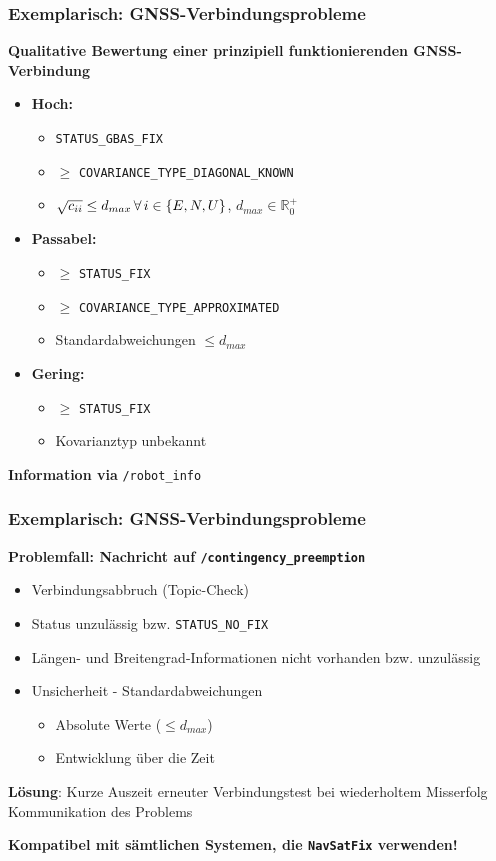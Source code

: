 \documentclass{beamer}
\newcommand{\code}[1]{\colorbox{light-gray}{\texttt{#1}}}
\begin{document}
\begin{frame}
  \frametitle{Exemplarisch: GNSS-Verbindungsprobleme}
  \textbf{Qualitative Bewertung einer prinzipiell funktionierenden GNSS-Verbindung}
  \begin{itemize}
    \item \textbf{Hoch:}
    \begin{itemize}
      \item \code{STATUS\_GBAS\_FIX}
      \item $\geq$ \code{COVARIANCE\_TYPE\_DIAGONAL\_KNOWN}
      \item $\sqrt{c_{ii}} \leq d_{max} \thinspace \forall \thinspace i \in \{E, N, U\}$, $d_{max} \in \mathbb{R}_{0}^{+}$
    \end{itemize}
    \item \textbf{Passabel:}
    \begin{itemize}
      \item $\geq$ \code{STATUS\_FIX}
      \item $\geq$ \code{COVARIANCE\_TYPE\_APPROXIMATED}
      \item Standardabweichungen $\leq d_{max}$
    \end{itemize}
    \item \textbf{Gering:}
    \begin{itemize}
      \item $\geq$ \code{STATUS\_FIX}
      \item Kovarianztyp unbekannt
    \end{itemize}
  \end{itemize}
  \textbf{Information via} \code{/robot\_info}
\end{frame}

\begin{frame}
  \frametitle{Exemplarisch: GNSS-Verbindungsprobleme}
  \textbf{Problemfall: Nachricht auf \code{/contingency\_preemption}}
  \begin{itemize}
    \item Verbindungsabbruch (Topic-Check)
    \item Status unzulässig bzw. \code{STATUS\_NO\_FIX}
    \item Längen- und Breitengrad-Informationen nicht vorhanden bzw. unzulässig
    \item Unsicherheit - Standardabweichungen
    \begin{itemize}
      \item Absolute Werte ($\leq d_{max}$)
      \item Entwicklung über die Zeit
    \end{itemize}
  \end{itemize}
  \textbf{Lösung}: Kurze Auszeit \textrightarrow \thinspace erneuter Verbindungstest \textrightarrow \thinspace bei wiederholtem Misserfolg Kommunikation des Problems

  \textbf{Kompatibel mit sämtlichen Systemen, die \code{NavSatFix} verwenden!}
\end{frame}
\end{document}
